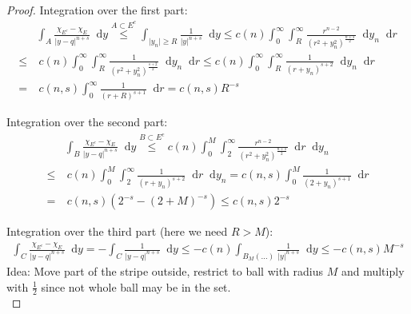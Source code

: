 \documentclass[11pt]{article}
\newcommand*{\dd}[1]{\mathop{}\!\mathrm{d}#1} %
\begin{document}
\begin{proof}
	Integration over the first part:
	\begin{align*}
		     & \int_A \frac{\chi_{E^c} -\chi_E}{\lvert y-q\rvert^{n+s}} \dd{y} \overset{A \subset E^c}{ \leq} \int_{\lvert y_n \rvert \geq R} \frac{1}{\lvert y \rvert^{n+s}} \dd{y} \leq c(n) \int_0^\infty \int_R^\infty \frac{r^{n-2}}{(r^2 +y_n^2)^{\frac{n+s}{2}}} \dd{y_n} \dd{r} \\
		\leq & \ c(n) \int_0^\infty \int_R^\infty \frac{1}{(r^2 +y_n^2)^{\frac{s+2}{2}}} \dd{y_n} \dd{r} \leq c(n) \int_0^\infty \int_R^\infty \frac{1}{(r+y_n)^{s+2}} \dd{y_n} \dd{r} \\
		=    & \ c(n,s) \int_0^\infty \frac{1}{(r+R)^{s+1}} \dd{r} = c(n,s) R^{-s}
	\end{align*}

	Integration over the second part:
	\begin{align*}
		     & \int_B \frac{\chi_{E^c} -\chi_E}{\lvert y-q\rvert^{n+s}} \dd{y} \overset{B \subset E^c}{ \leq} c(n) \int_0^M \int_2^\infty \frac{r^{n-2}}{(r^2 +y_n^2)^{\frac{n+s}{2}}} \dd{r} \dd{y_n} \\
		\leq & \ c(n) \int_0^M \int_2^\infty \frac{1}{( r+y_n)^{s+2}} \dd{r} \dd{y_n} = c(n,s) \int_0^M \frac{1}{(2+y_n)^{s+1}} \dd{r} \\
		=    & \ c(n,s)(2^{-s}-(2+M)^{-s}) \leq c(n,s) 2^{-s}
	\end{align*}

	Integration over the third part (here we need \( R > M \)):
	\begin{align*}
		\int_C \frac{\chi_{E^c} -\chi_E}{\lvert y-q\rvert^{n+s}} \dd{y} = - \int_C \frac{1}{\lvert y-q \rvert^{n+s}} \dd{y} \leq -c(n) \int_{B_M (\ldots)} \frac{1}{\lvert y\rvert^{n+s}} \dd{y} \leq -c(n,s) M^{-s}
	\end{align*}
	Idea: Move part of the stripe outside, restrict to ball with radius \( M \) and
	multiply with \( \frac{1}{2} \) since not whole ball may be in the set.\\


\end{proof}
\end{document}
